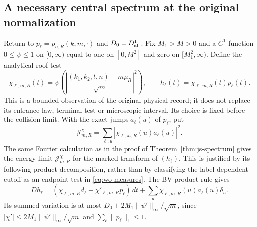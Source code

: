 \subsection{A necessary central spectrum at the original normalization}

Return to $p_\ell=p_{n,R}(k,m,\cdot)$ and
$D_0=D_{\rm all}^{1}$. Fix $M_1>M>0$ and a $C^1$ function
$0\le\psi\le1$ on $[0,\infty)$ equal to one on $[0,M^2]$
and zero on $[M_1^2,\infty)$. Define the analytical roof test
\begin{equation}\label{eq:js-central-cutoff}
 \chi_{\ell,m,R}(t)=\psi\left(
 \left|\frac{(k_1,k_2,t,n)-m\mu_R}{\sqrt m}\right|^2\right),
 \qquad h_\ell(t)=\chi_{\ell,m,R}(t)p_\ell(t).
\end{equation}
This is a bounded observation of the original physical record;
it does not replace its entrance law, terminal test or
microscopic interval. Its choice is fixed before the collision
limit. With the exact jumps $a_\ell(u)$ of $p_\ell$, put
\[
 \mathcal J^\chi_{m,R}
     =\sum_{\ell,u}|\chi_{\ell,m,R}(u)a_\ell(u)|^2.
\]
The same Fourier calculation as in the proof of
Theorem~\ref{thm:js-spectrum} gives the energy limit
$\mathcal J^\chi_{m,R}$ for the marked transform of $(h_\ell)$.
This is justified by its following product decomposition, rather
than by classifying the label-dependent cutoff as an endpoint
test in \eqref{eq:wo-measures}. The BV product rule gives
\[
 D h_\ell=(\chi_{\ell,m,R}d_\ell+
                 \chi'_{\ell,m,R}p_\ell)\,dt
       +\sum_u\chi_{\ell,m,R}(u)a_\ell(u)\delta_u.
\]
Its summed variation is at most
$D_0+2M_1\|\psi'\|_\infty/\sqrt m$, since
$|\chi'|\le2M_1\|\psi'\|_\infty/\sqrt m$ and
$\sum_\ell\|p_\ell\|_1\le1$.

